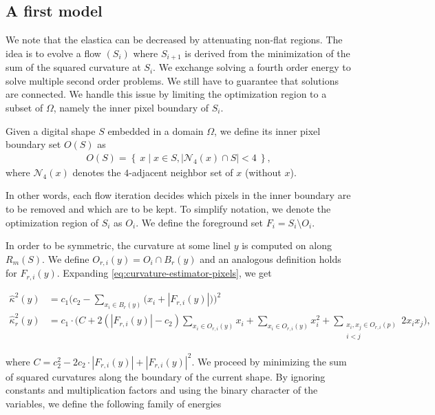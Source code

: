 \documentclass[runningheads]{llncs}
\begin{document}
\subsection{A first model}

We note that the elastica can be decreased by attenuating non-flat regions. The idea is to evolve a flow $(S_i)$ where $S_{i+1}$ is derived from the minimization of the sum of the squared curvature at $S_i$. We exchange solving a fourth order energy to solve multiple second order problems. We still have to guarantee that solutions are connected. We handle this issue by limiting the optimization region to a subset of $\Omega$, namely the inner pixel boundary of  $S_i$.

\begin{definition}
{
Given a digital shape $S$ embedded in a domain $\Omega$, we define its inner pixel boundary set $O(S)$ as
\begin{align*}
	O(S) = \left\{ \: x \; | \; x \in S, |\mathcal{N}_4(x) \cap S|<4 \: \right\},
\end{align*}
where $\mathcal{N}_4(x)$ denotes the $4$-adjacent neighbor set of $x$ (without $x$).
}
\end{definition}

In other words, each flow iteration decides which pixels in the inner boundary are to be removed and which are to be kept. To simplify notation, we denote the optimization region of $S_i$ as $O_i$. We define the foreground set $F_i = S_i \setminus O_i$.

In order to be symmetric, the curvature at some linel $y$ is computed on along $R_m(S)$. We define $O_{r,i}(y) = O_i \cap B_r(y)$ and an analogous definition holds for $F_{r,i}(y)$. Expanding \eqref{eq:curvature-estimator-pixels}, we get 

	\begin{align*}
		\hat{\kappa}^2(y) &= c_1\Big( c_2 - \sum_{x_i \in B_r(y)} \big( {x_i} + |F_{r,i}(y)| \big) \Big)^2 \\
		\hat{\kappa}_{r}^2(y) &= c_1 \cdot \Big( C + 2\left( |F_{r,i}(y)| - c_2 \right) \sum_{x_i \in O_{r,i}(y)}{x_i} + \sum_{x_i \in O_{r,i}(y)}{x_i^2} + \sum_{ \substack{x_i,x_j \in O_{r,i}(p) \\ i<j} }{2x_ix_j}  \Big),
	\end{align*}
	
	where $C=c_2^2 - 2c_2 \cdot |F_{r,i}(y)| + |F_{r,i}(y)|^2$. We proceed by minimizing the sum of squared curvatures along the boundary of the current shape. By ignoring constants and multiplication factors and using the binary character of the variables, we define the following family of energies
	
\end{document}

